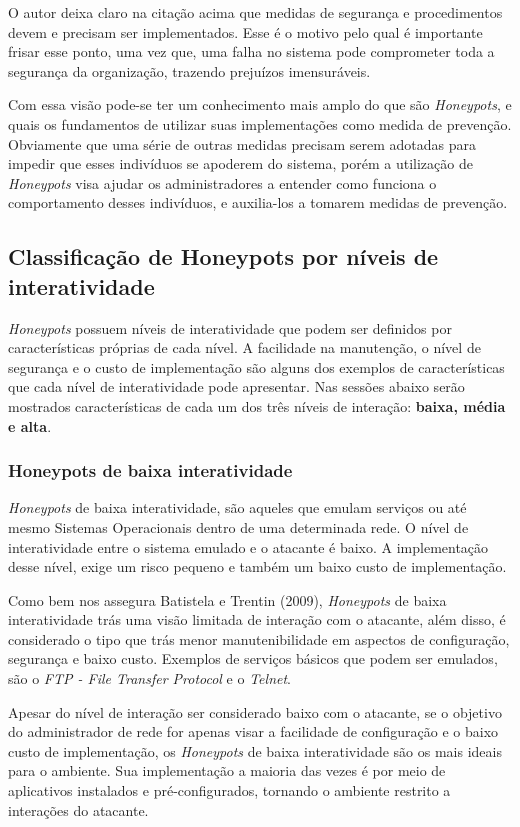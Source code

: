 O autor deixa claro na citação acima que medidas de segurança e procedimentos devem e precisam ser implementados. Esse é o motivo pelo qual é importante frisar esse ponto, uma vez que, uma falha no sistema pode comprometer toda a segurança da organização, trazendo prejuízos imensuráveis.

Com essa visão pode-se ter um conhecimento mais amplo do que são \textit{Honeypots}, e quais os fundamentos de utilizar suas implementações como medida de prevenção. Obviamente que uma série de outras medidas precisam serem adotadas para impedir que esses indivíduos se apoderem do sistema, porém a utilização de \textit{Honeypots} visa ajudar os administradores a entender como funciona o comportamento desses indivíduos, e auxilia-los a tomarem medidas de prevenção.

\subsection{Classificação de Honeypots por níveis de interatividade}
\textit{Honeypots} possuem níveis de interatividade que podem ser definidos por características próprias de cada nível. A facilidade na manutenção, o nível de segurança e o custo de implementação são alguns dos exemplos de características que cada nível de interatividade pode apresentar. Nas sessões abaixo serão mostrados características de cada um dos três níveis de interação: \textbf{baixa, média e alta}.

\subsubsection{Honeypots de baixa interatividade}
\textit{Honeypots} de baixa interatividade, são aqueles que emulam serviços ou até mesmo Sistemas Operacionais dentro de uma determinada rede. O nível de interatividade entre o sistema emulado e o atacante é baixo. A implementação desse nível, exige um risco pequeno e também um baixo custo de implementação.

Como bem nos assegura Batistela e Trentin (2009), \textit{Honeypots} de baixa interatividade trás uma visão limitada de interação com o atacante, além disso, é considerado o tipo que trás menor manutenibilidade em aspectos de configuração, segurança e baixo custo. Exemplos de serviços básicos que podem ser emulados, são o \textit{FTP - File Transfer Protocol} e o \textit{Telnet}.

Apesar do nível de interação ser considerado baixo com o atacante, se o objetivo do administrador de rede for apenas visar a facilidade de configuração e o baixo custo de implementação, os \textit{Honeypots} de baixa interatividade são os mais ideais para o ambiente. Sua implementação a maioria das vezes é por meio de aplicativos instalados e pré-configurados, tornando o ambiente restrito a interações do atacante.

